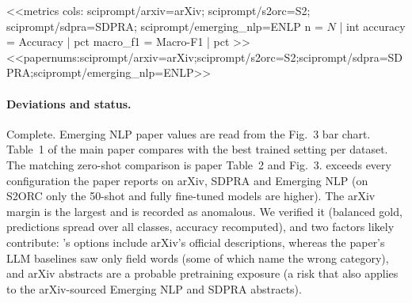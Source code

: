 <<metrics
cols: sciprompt/arxiv=arXiv; sciprompt/s2orc=S2; sciprompt/sdpra=SDPRA; sciprompt/emerging_nlp=ENLP
n = $N$ | int
accuracy = Accuracy | pct
macro_f1 = Macro-F1 | pct
>>
<<papernums:sciprompt/arxiv=arXiv;sciprompt/s2orc=S2;sciprompt/sdpra=SDPRA;sciprompt/emerging_nlp=ENLP>>

\paragraph{Deviations and status.} Complete. Emerging NLP paper values are read from the Fig.~3 bar chart. Table~1 of
the main paper compares with the best trained setting per dataset. The matching zero-shot comparison is paper
Table~2 and Fig.~3. \jev{} exceeds every configuration the paper reports on arXiv, SDPRA and Emerging NLP (on S2ORC
only the 50-shot and fully fine-tuned models are higher). The arXiv margin is the largest and is recorded as
anomalous. We verified it (balanced gold, predictions spread over all classes, accuracy recomputed), and two factors
likely contribute: \jev{}'s options include arXiv's official descriptions, whereas the paper's LLM baselines saw only
field words (some of which name the wrong category), and arXiv abstracts are a probable pretraining exposure (a
risk that also applies to the arXiv-sourced Emerging NLP and SDPRA abstracts).
